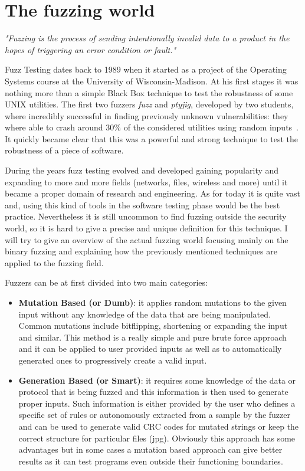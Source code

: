 \documentclass[../main.tex]{subfiles}
\begin{document}
\section{The fuzzing world}

\textit{"Fuzzing is the process of sending intentionally invalid data to a
product in the hopes of triggering an error condition or fault."}
\cite{Sutton2007}

Fuzz Testing dates back to 1989 when it started as a project of the Operating
Systems course at the University of Wisconsin-Madison. At his first stages it
was nothing more than a simple Black Box technique to test the robustness of
some UNIX utilities. The first two fuzzers \textit{fuzz} and \textit{ptyjig},
developed by two students, where incredibly successful in finding previously
unknown vulnerabilities: they where able to crash around 30\% of the considered
utilities using random inputs~\cite{firstFuzzPaper}.
It quickly became clear that this was a powerful and strong technique to test
the robustness of a piece of software.

During the years fuzz testing evolved and developed gaining popularity and
expanding to more and more fields (networks, files, wireless and more) until it
became a proper domain of research and engineering. As for today it is
quite vast and, using this kind of tools in the software testing phase would be the best practice. Nevertheless it is still uncommon to find fuzzing
outside the security world, so it is hard to give a precise and unique
definition for this technique. I will try to give an overview of the actual fuzzing world focusing mainly on the binary fuzzing and explaining how the previously mentioned techniques are applied to the fuzzing field.

Fuzzers can be at first divided into two main categories:

\begin{itemize}
  \item{\textbf{Mutation Based (or Dumb)}: it applies random mutations to the
  given  input without any knowledge of the data that are being manipulated.
  Common  mutations include bitflipping, shortening or expanding the input and
  similar.  This  method is a really simple and pure brute force approach and it
  can be  applied  to user provided inputs as well as to automatically generated
  ones to  progressively create a valid input.}

  \item{\textbf{Generation Based (or Smart)}: it requires some knowledge of the
  data or protocol that is being fuzzed and this information is then used to
  generate proper inputs. Such information is either provided by the user
  who defines a specific set of rules or autonomously extracted from a sample
  by the  fuzzer and can be used to generate valid CRC codes for mutated  strings  or  keep the correct  structure for particular files (jpg). Obviously this approach has some  advantages but in some cases a mutation based approach can  give better results  as it can test programs even outside their functioning  boundaries.}

\end{itemize}
\end{document}
